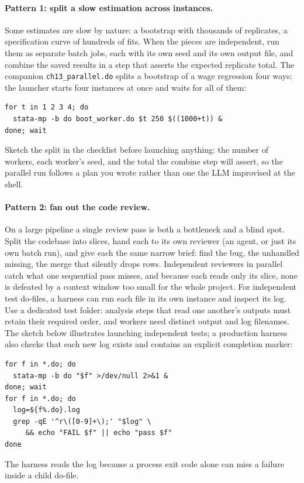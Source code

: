 \paragraph{Pattern 1: split a slow estimation across instances.} Some estimates are slow by nature: a bootstrap with thousands of replicates, a specification curve of hundreds of fits. When the pieces are independent, run them as separate batch jobs, each with its own seed and its own output file, and combine the saved results in a step that asserts the expected replicate total. The companion \texttt{ch13\_parallel.do} splits a bootstrap of a wage regression four ways; the launcher starts four instances at once and waits for all of them:
\par
{\footnotesize
\begin{verbatim}
for t in 1 2 3 4; do
  stata-mp -b do boot_worker.do $t 250 $((1000+t)) &
done; wait
\end{verbatim}
}
Sketch the split in the checklist before launching anything: the number of workers, each worker's seed, and the total the combine step will assert, so the parallel run follows a plan you wrote rather than one the LLM improvised at the shell.

\paragraph{Pattern 2: fan out the code review.} On a large pipeline a single review pass is both a bottleneck and a blind spot. Split the codebase into slices, hand each to its own reviewer (an agent, or just its own batch run), and give each the same narrow brief: find the bug, the unhandled missing, the merge that silently drops rows. Independent reviewers in parallel catch what one sequential pass misses, and because each reads only its slice, none is defeated by a context window too small for the whole project. For independent test do-files, a harness can run each file in its own instance and inspect its log. Use a dedicated test folder: analysis steps that read one another's outputs must retain their required order, and workers need distinct output and log filenames. The sketch below illustrates launching independent tests; a production harness also checks that each new log exists and contains an explicit completion marker:
\par
{\footnotesize
\begin{verbatim}
for f in *.do; do
  stata-mp -b do "$f" >/dev/null 2>&1 &
done; wait
for f in *.do; do
  log=${f%.do}.log
  grep -qE '^r\([0-9]+\);' "$log" \
     && echo "FAIL $f" || echo "pass $f"
done
\end{verbatim}
}
The harness reads the log because a process exit code alone can miss a failure inside a child do-file.

